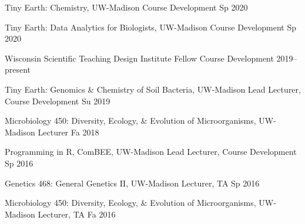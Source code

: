 

\begin{cvhonors}

\cvhonor
{Tiny Earth: Chemistry, UW-Madison}
{Course Development}
{Sp 2020}

\cvhonor
{Tiny Earth: Data Analytics for Biologists, UW-Madison}
{Course Development}
{Sp 2020}

\cvhonor
{Wisconsin Scientific Teaching Design Institute Fellow}
{Course Development}
{2019--present}

\cvhonor
{Tiny Earth: Genomics \& Chemistry of Soil Bacteria, UW-Madison}
{Lead Lecturer, Course Development}
{Su 2019}

\cvhonor
{Microbiology 450: Diversity, Ecology, \& Evolution of Microorganisms, UW-Madison}
{Lecturer}
{Fa 2018}

\end{cvhonors} \begin{cvhonors}

\cvhonor
{Programming in R, ComBEE, UW-Madison}
{Lead Lecturer, Course Development}
{Sp 2016}

\cvhonor
{Genetics 468: General Genetics II, UW-Madison}
{Lecturer, TA}
{Sp 2016}

\cvhonor
{Microbiology 450: Diversity, Ecology, \& Evolution of Microorganisms, UW-Madison}
{Lecturer, TA}
{Fa 2016}

\end{cvhonors}